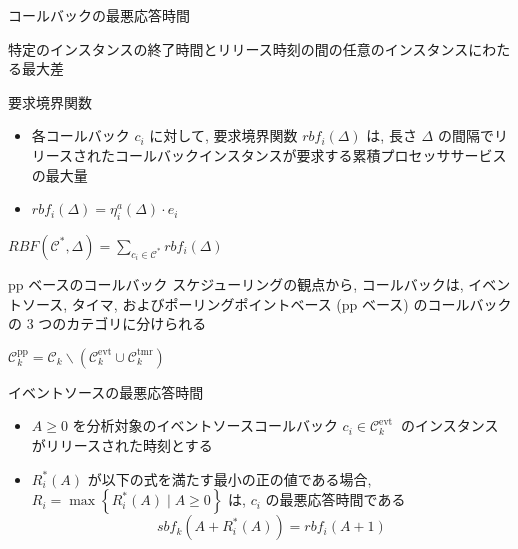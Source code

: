 \begin{frame}{コールバックの最悪応答時間}
    \begin{definition}
        特定のインスタンスの終了時間とリリース時刻の間の任意のインスタンスにわたる最大差
    \end{definition}
\end{frame}

\begin{frame}{要求境界関数}
    \begin{definition}
        \setlength{\linewidth}{0.98\columnwidth}
        \begin{itemize}
            \item 各コールバック $c_{i}$ に対して, 要求境界関数 $rbf_{i}(\Delta)$ は, 長さ $\Delta$ の間隔でリリースされたコールバックインスタンスが要求する累積プロセッササービスの最大量
            \item $r b f_{i}(\Delta)=\eta_{i}^{a}(\Delta) \cdot e_{i}$
        \end{itemize}
    \end{definition}
    \begin{definition}
        $R B F\left(\mathcal{C}^{*}, \Delta\right)=\sum_{c_{i} \in \mathcal{C}^{*}} r b f_{i}(\Delta)$
    \end{definition}
\end{frame}

\begin{frame}{pp ベースのコールバック}
    スケジューリングの観点から, コールバックは, イベントソース, タイマ, およびポーリングポイントベース (pp ベース) のコールバックの 3 つのカテゴリに分けられる
    \begin{definition}
        $\mathcal{C}_{k}^{\mathrm{pp}}=\mathcal{C}_{k} \backslash\left(\mathcal{C}_{k}^{\text {evt}} \cup \mathcal{C}_{k}^{\mathrm{tmr}}\right)$
    \end{definition}
\end{frame}

\begin{frame}[label=lemma1]{イベントソースの最悪応答時間}
    \begin{lemma}[イベントソースの最悪応答時間]
        \begin{itemize}
            \item $A \geq 0$ を分析対象のイベントソースコールバック $c_{i} \in \mathcal{C}_{k}^{\text {evt }}$ のインスタンスがリリースされた時刻とする
            \item $R_{i}^{*}(A)$ が以下の式を満たす最小の正の値である場合, $R_{i}=\max \left\{R_{i}^{*}(A) \mid A \geq 0\right\}$ は, $c_{i}$ の最悪応答時間である
                  \begin{equation*}
                      s b f_{k}\left(A+R_{i}^{*}(A)\right)=r b f_{i}(A+1)
                  \end{equation*}
        \end{itemize}
    \end{lemma}
\end{frame}


